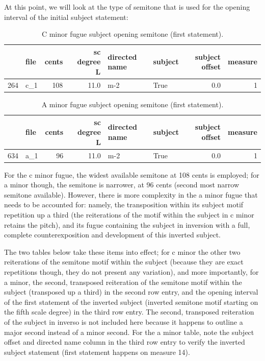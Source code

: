 At this point, we will look at the type of semitone that is used for the
opening interval of the initial subject statement:

\begin{singlespace}
\begin{table}[H]
\centering
\tiny
\begin{tabular}{|llrrllrr|}
\hline
\textbf{{}} & \textbf{file} & \textbf{ cents} & \textbf{ sc degree L} & \textbf{directed name} & \textbf{subject} & \textbf{ subject offset} & \textbf{ measure }\\
\hline
264 &  c\_1 &    108 &         11.0 &           m-2 &    True &             0.0 &        1 \\
\hline
\end{tabular}
\caption{C minor fugue subject opening semitone (first statement). }
\end{table}
\normalsize
\end{singlespace}

\begin{singlespace}
\begin{table}[H]
\centering
\tiny
\begin{tabular}{|llrrllrr|}
\hline
\textbf{{}} & \textbf{file} & \textbf{ cents} & \textbf{ sc degree L} & \textbf{directed name} & \textbf{subject} & \textbf{ subject offset} & \textbf{ measure }\\
\hline
634 &  a\_1 &     96 &         11.0 &           m-2 &    True &             0.0 &        1 \\
\hline
\end{tabular}
\caption{A minor fugue subject opening semitone (first statement). }
\end{table}
\normalsize
\end{singlespace}

    For the c minor fugue, the widest available semitone at 108 cents is
employed; for a minor though, the semitone is narrower, at 96 cents
(second most narrow semitone available). However, there is more
complexity in the a minor fugue that needs to be accounted for: namely,
the transposition within its subject motif repetition up a third (the
reiterations of the motif within the subject in c minor retains the
pitch), and its fugue containing the subject in inversion with a full,
complete counterexposition and development of this inverted subject.

The two tables below take these items into effect; for c minor the other
two reiterations of the semitone motif within the subject (because they
are exact repetitions though, they do not present any variation), and
more importantly, for a minor, the second, transposed reiteration of the
semitone motif within the subject (transposed up a third) in the second
row entry, and the opening interval of the first statement of the
inverted subject (inverted semitone motif starting on the fifth scale
degree) in the third row entry. The second, transposed reiteration of
the subject in inverso is not included here because it happens to
outline a major second instead of a minor second. For the a minor table,
note the subject offset and directed name column in the third row entry
to verify the inverted subject statement (first statement happens on
measure 14).


